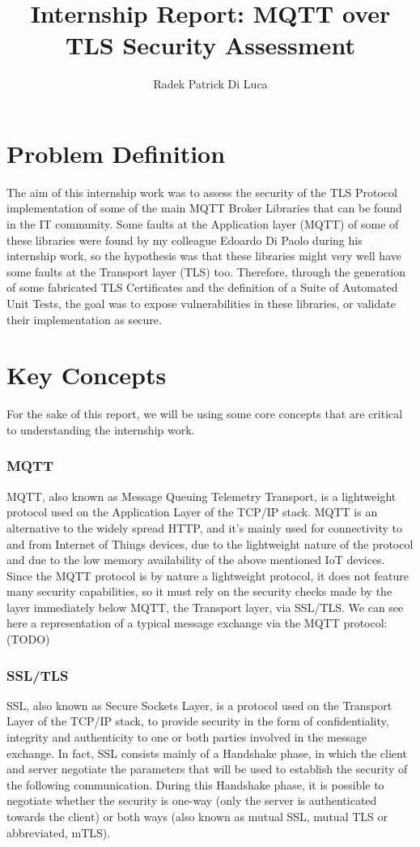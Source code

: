 \documentclass[binding=0.6cm,noexaminfo]{sapthesis}
\title{Internship Report: MQTT over TLS Security Assessment} \author{Radek Patrick Di Luca}
\begin{document}
\frontmatter
\maketitle
\tableofcontents
\mainmatter
\chapter{Problem Definition}
The aim of this internship work was to assess the security of the TLS Protocol implementation of some of the main MQTT Broker Libraries that can be found in the IT community. Some faults at the Application layer (MQTT) of some of these libraries were found by my colleague Edoardo Di Paolo during his internship work, so the hypothesis was that these libraries might very well have some faults at the Transport layer (TLS) too.
Therefore, through the generation of some fabricated TLS Certificates and the definition of a Suite of Automated Unit Tests, the goal was to expose vulnerabilities in these libraries, or validate their implementation as secure.

\chapter{Key Concepts}
For the sake of this report, we will be using some core concepts that are critical to understanding the internship work.

\subsection{MQTT}
MQTT, also known as Message Queuing Telemetry Transport, is a lightweight protocol used on the Application Layer of the TCP/IP stack. MQTT is an alternative to the widely spread HTTP, and it’s mainly used for connectivity to and from Internet of Things devices, due to the lightweight nature of the protocol and due to the low memory availability of the above mentioned IoT devices.
Since the MQTT protocol is by nature a lightweight protocol, it does not feature many security capabilities, so it must rely on the security checks made by the layer immediately below MQTT, the Transport layer, via SSL/TLS.
We can see here a representation of a typical message exchange via the MQTT protocol: (TODO)

\subsection{SSL/TLS}
SSL, also known as Secure Sockets Layer, is a protocol used on the Transport Layer of the TCP/IP stack, to provide security in the form of confidentiality, integrity and authenticity to one or both parties involved in the message exchange. In fact, SSL consists mainly of a Handshake phase, in which the client and server negotiate the parameters that will be used to establish the security of the following communication. During this Handshake phase, it is possible to negotiate whether the security is one-way (only the server is authenticated towards the client) or both ways (also known as mutual SSL, mutual TLS or abbreviated, mTLS).
\end{document}
